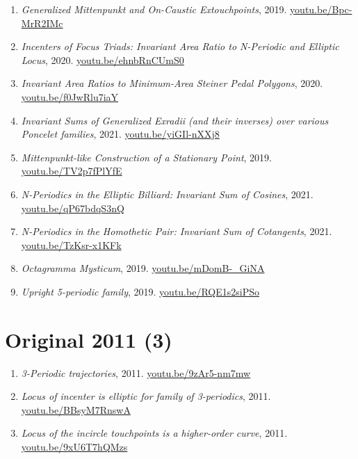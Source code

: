 \documentclass[12pt]{article}
\begin{document}
\begin{enumerate}[resume]
\item \textit{Generalized Mittenpunkt and On-Caustic Extouchpoints}, 2019. \href{https://youtu.be/Bpc-MrR2IMc}{\url{youtu.be/Bpc-MrR2IMc}}
\item \textit{Incenters of Focus Triads: Invariant Area Ratio to N-Periodic and Elliptic Locus}, 2020. \href{https://youtu.be/ehnbRnCUmS0}{\url{youtu.be/ehnbRnCUmS0}}
\item \textit{Invariant Area Ratios to Minimum-Area Steiner Pedal Polygons}, 2020. \href{https://youtu.be/f0JwRlu7iaY}{\url{youtu.be/f0JwRlu7iaY}}
\item \textit{Invariant Sums of Generalized Exradii (and their inverses) over various Poncelet families}, 2021. \href{https://youtu.be/yiGIl-nXXj8}{\url{youtu.be/yiGIl-nXXj8}}
\item \textit{Mittenpunkt-like Construction of a Stationary Point}, 2019. \href{https://youtu.be/TV2p7fPlYfE}{\url{youtu.be/TV2p7fPlYfE}}
\item \textit{N-Periodics in the Elliptic Billiard: Invariant Sum of Cosines}, 2021. \href{https://youtu.be/qP67bdqS3nQ}{\url{youtu.be/qP67bdqS3nQ}}
\item \textit{N-Periodics in the Homothetic Pair: Invariant Sum of Cotangents}, 2021. \href{https://youtu.be/TzKsr-x1KFk}{\url{youtu.be/TzKsr-x1KFk}}
\item \textit{Octagramma Mysticum}, 2019. \href{https://youtu.be/mDomB-_GiNA}{\url{youtu.be/mDomB-\_GiNA}}
\item \textit{Upright 5-periodic family}, 2019. \href{https://youtu.be/RQE1s2siPSo}{\url{youtu.be/RQE1s2siPSo}}
\end{enumerate}

\section{Original 2011 (3)}

\begin{enumerate}[resume]
\item \textit{3-Periodic trajectories}, 2011. \href{https://youtu.be/9zAr5-nm7mw}{\url{youtu.be/9zAr5-nm7mw}}
\item \textit{Locus of incenter is elliptic for family of 3-periodics}, 2011. \href{https://youtu.be/BBsyM7RnswA}{\url{youtu.be/BBsyM7RnswA}}
\item \textit{Locus of the incircle touchpoints is a higher-order curve}, 2011. \href{https://youtu.be/9xU6T7hQMzs}{\url{youtu.be/9xU6T7hQMzs}}
\end{enumerate}
\end{document}
